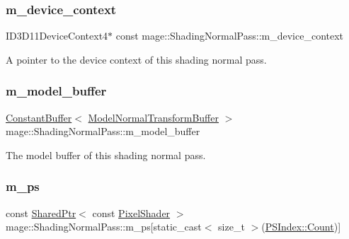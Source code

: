 \subsubsection{\texorpdfstring{m\+\_\+device\+\_\+context}{m\_device\_context}}
{\footnotesize\ttfamily I\+D3\+D11\+Device\+Context4$\ast$ const mage\+::\+Shading\+Normal\+Pass\+::m\+\_\+device\+\_\+context\hspace{0.3cm}{\ttfamily [private]}}

A pointer to the device context of this shading normal pass. \hypertarget{classmage_1_1_shading_normal_pass_a948daea5dea9b2cd2b2eaf30a1341231}{}\label{classmage_1_1_shading_normal_pass_a948daea5dea9b2cd2b2eaf30a1341231} 
\subsubsection{\texorpdfstring{m\+\_\+model\+\_\+buffer}{m\_model\_buffer}}
{\footnotesize\ttfamily \hyperlink{structmage_1_1_constant_buffer}{Constant\+Buffer}$<$ \hyperlink{structmage_1_1_model_normal_transform_buffer}{Model\+Normal\+Transform\+Buffer} $>$ mage\+::\+Shading\+Normal\+Pass\+::m\+\_\+model\+\_\+buffer\hspace{0.3cm}{\ttfamily [private]}}

The model buffer of this shading normal pass. \hypertarget{classmage_1_1_shading_normal_pass_a3dbbd1bd2612ccaec66c551f251a47e9}{}\label{classmage_1_1_shading_normal_pass_a3dbbd1bd2612ccaec66c551f251a47e9} 
\subsubsection{\texorpdfstring{m\+\_\+ps}{m\_ps}}
{\footnotesize\ttfamily const \hyperlink{namespacemage_a1e01ae66713838a7a67d30e44c67703e}{Shared\+Ptr}$<$ const \hyperlink{namespacemage_a27ecaf266420ee7a494d64edc0757129}{Pixel\+Shader} $>$ mage\+::\+Shading\+Normal\+Pass\+::m\+\_\+ps\mbox{[}static\+\_\+cast$<$ size\+\_\+t $>$(\hyperlink{classmage_1_1_shading_normal_pass_a6d277753d26a7854c448b3e0d9275b19ae93f994f01c537c4e2f7d8528c3eb5e9}{P\+S\+Index\+::\+Count})\mbox{]}\hspace{0.3cm}{\ttfamily [private]}}

